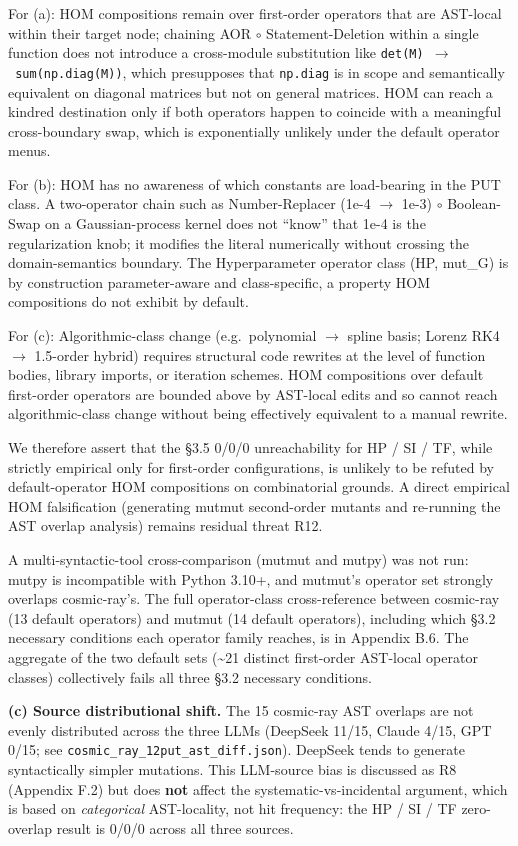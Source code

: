 \documentclass[manuscript,screen,review]{acmart}
\begin{document}
For (a): HOM compositions remain over first-order operators that are
AST-local within their target node; chaining AOR $\circ$ Statement-Deletion
within a single function does not introduce a cross-module substitution
like \texttt{det(M)\ $\to$\ sum(np.diag(M))}, which presupposes that
\texttt{np.diag} is in scope and semantically equivalent on diagonal
matrices but not on general matrices. HOM can reach a kindred
destination only if both operators happen to coincide with a meaningful
cross-boundary swap, which is exponentially unlikely under the default
operator menus.

For (b): HOM has no awareness of which constants are load-bearing in the
PUT class. A two-operator chain such as Number-Replacer (1e-4 $\to$ 1e-3) $\circ$
Boolean-Swap on a Gaussian-process kernel does not ``know'' that 1e-4 is
the regularization knob; it modifies the literal numerically without
crossing the domain-semantics boundary. The Hyperparameter operator
class (HP, mut\_G) is by construction parameter-aware and
class-specific, a property HOM compositions do not exhibit by default.

For (c): Algorithmic-class change (e.g.~polynomial $\to$ spline basis;
Lorenz RK4 $\to$ 1.5-order hybrid) requires structural code rewrites at the
level of function bodies, library imports, or iteration schemes. HOM
compositions over default first-order operators are bounded above by
AST-local edits and so cannot reach algorithmic-class change without
being effectively equivalent to a manual rewrite.

We therefore assert that the §3.5 0/0/0 unreachability for HP / SI / TF,
while strictly empirical only for first-order configurations, is
unlikely to be refuted by default-operator HOM compositions on
combinatorial grounds. A direct empirical HOM falsification (generating
mutmut second-order mutants and re-running the AST overlap analysis)
remains residual threat R12.

A multi-syntactic-tool cross-comparison (mutmut and mutpy) was not run:
mutpy is incompatible with Python 3.10+, and mutmut's operator
set strongly overlaps cosmic-ray's. The full operator-class
cross-reference between cosmic-ray (13 default operators) and mutmut (14
default operators), including which §3.2 necessary conditions each
operator family reaches, is in Appendix B.6. The aggregate of the two
default sets (\textasciitilde21 distinct first-order AST-local operator
classes) collectively fails all three §3.2 necessary conditions.

\textbf{(c) Source distributional shift.} The 15 cosmic-ray AST
overlaps are not evenly distributed across the three LLMs (DeepSeek
11/15, Claude 4/15, GPT 0/15; see
\texttt{cosmic\_ray\_12put\_ast\_diff.json}). DeepSeek tends to generate
syntactically simpler mutations. This LLM-source bias is discussed as R8
(Appendix F.2) but does \textbf{not} affect the systematic-vs-incidental
argument, which is based on \emph{categorical} AST-locality, not hit
frequency: the HP / SI / TF zero-overlap result is 0/0/0 across all
three sources.
\end{document}
